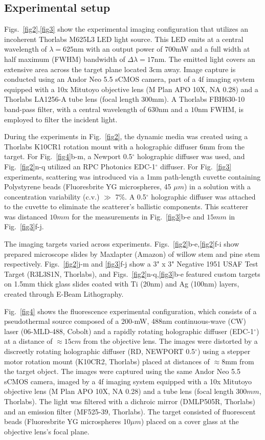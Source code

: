 \documentclass[pdflatex,sn-mathphys-num]{sn-jnl}%
\theoremstyle{thmstyleone}%
\theoremstyle{thmstyletwo}%
\theoremstyle{thmstylethree}%
\begin{document}
\subsection*{Experimental setup}

Figs.~\ref{fig2},\ref{fig3} show the experimental imaging configuration that utilizes an incoherent Thorlabs M625L3 LED light source. This LED emits at a central wavelength of $\lambda = 625$nm with an output power of 700mW and a full width at half maximum (FWHM) bandwidth of $\Delta \lambda = 17$nm. The emitted light covers an extensive area across the target plane located 3cm away. Image capture is conducted using an Andor Neo 5.5 sCMOS camera, part of a 4f imaging system equipped with a 10x Mitutoyo objective lens (M Plan APO 10X, NA 0.28) and a Thorlabs LA1256-A tube lens (focal length $300$mm). A Thorlabs FBH630-10 band-pass filter, with a central wavelength of $630$nm and a $10$nm FWHM, is employed to filter the incident light.

During the experiments in Fig.~\ref{fig2}, the dynamic media was created using a Thorlabs K10CR1 rotation mount with a holographic diffuser 6mm from the target. For Fig.~\ref{fig4}b-m, a Newport 0.5$^\circ$ holographic diffuser was used, and Fig.~\ref{fig2}n-q utilized an RPC Photonics EDC-1$^\circ$ diffuser.
For Fig.~\ref{fig3} experiments, scattering was introduced via a 1mm path-length cuvette containing Polystyrene beads (Fluoresbrite YG microspheres, 45 $\mu m$) in a solution with a concentration variability (c.v.) $\gg$ 7\%. A 0.5$^\circ$ holographic diffuser was attached to the cuvette to eliminate the scatterer's ballistic components. This scatterer was distanced $10mm$ for the measurements in Fig.~\ref{fig3}b-e and $15mm$ in Fig.~\ref{fig3}f-j.

The imaging targets varied across experiments. Figs.~\ref{fig2}b-e,\ref{fig2}f-i show prepared microscope slides by Maxlapter (Amazon) of willow stem and pine stem respectively. Figs.~\ref{fig2}j-m and \ref{fig3}f-j show a 3" x 3" Negative 1951 USAF Test Target (R3L3S1N, Thorlabs), and Figs.~\ref{fig2}n-q,\ref{fig3}b-e featured custom targets on 1.5mm thick glass slides coated with Ti (20nm) and Ag (100nm) layers, created through E-Beam Lithography.

Fig.~\ref{fig4} shows the fluorescence experimental configuration, which consists of a pseudothermal source composed of a 200-mW, 488nm continuous-wave (CW) laser (06-MLD-488, Cobolt) and a rapidly rotating holographic diffuser (EDC-1$^\circ$) at a distance of $\approx 15cm$ from the objective lens. The images were distorted by a discreetly rotating holographic diffuser (RD, NEWPORT 0.5$^\circ$) using a stepper motor rotation mount (K10CR2, Thorlabs) placed at distances of $\approx 8$mm from the target object. The images were captured using the same Andor Neo 5.5 sCMOS camera, imaged by a 4f imaging system equipped with a 10x Mitutoyo objective lens (M Plan APO 10X, NA 0.28) and a tube lens (focal length $300mm$, Thorlabs). The light was filtered with a dichroic mirror (DMLP505R, Thorlabs) and an emission filter (MF525-39, Thorlabs). The target consisted of fluorescent beads (Fluoresbrite YG microspheres 10$\mu m$) placed on a cover glass at the objective lens's focal plane.
\end{document}

